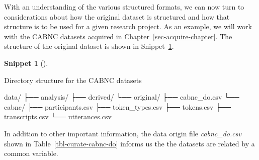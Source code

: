 \documentclass[
  letterpaper,
  krantz1]{latex/krantz-mod}
\newenvironment{Shaded}{\begin{snugshade}}{\end{snugshade}}
\newcommand{\ExtensionTok}[1]{\textcolor[rgb]{0.00,0.00,0.00}{#1}}
\newcommand{\NormalTok}[1]{\textcolor[rgb]{0.00,0.00,0.00}{#1}}
\theoremstyle{definition}
\theoremstyle{definition}
\newtheorem{definition}{Snippet}[chapter]
\theoremstyle{remark}
\begin{document}
With an understanding of the various structured formats, we can now turn
to considerations about how the original dataset is structured and how
that structure is to be used for a given research project. As an
example, we will work with the CABNC datasets acquired in
Chapter~\ref{sec-acquire-chapter}. The structure of the original dataset
is shown in Snippet~\ref{def-curate-cabnc-structure}.

\begin{definition}[]\protect\hypertarget{def-curate-cabnc-structure}{}\label{def-curate-cabnc-structure}

Directory structure for the CABNC datasets

\begin{Shaded}
\begin{Highlighting}[]
\ExtensionTok{data/}
\ExtensionTok{├──}\NormalTok{ analysis/}
\ExtensionTok{├──}\NormalTok{ derived/}
\ExtensionTok{└──}\NormalTok{ original/}
    \ExtensionTok{├──}\NormalTok{ cabnc\_do.csv}
    \ExtensionTok{└──}\NormalTok{ cabnc/}
        \ExtensionTok{├──}\NormalTok{ participants.csv}
        \ExtensionTok{├──}\NormalTok{ token\_types.csv}
        \ExtensionTok{├──}\NormalTok{ tokens.csv}
        \ExtensionTok{├──}\NormalTok{ transcripts.csv}
        \ExtensionTok{└──}\NormalTok{ utterances.csv}
\end{Highlighting}
\end{Shaded}

\end{definition}

In addition to other important information, the data origin file
\emph{cabnc\_do.csv} shown in Table~\ref{tbl-curate-cabnc-do} informs us
the the datasets are related by a common variable.
\end{document}
